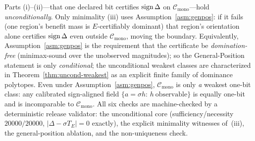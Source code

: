 \begin{remark}\label{rmk:genpos}
Parts (i)--(ii)---that one declared bit certifies $\operatorname{sign}\Delta$ on $\mathcal C_{\mathrm{mono}}$---hold
\emph{unconditionally}. Only minimality (iii) uses Assumption~\ref{asm:genpos}: if it fails (one
region's benefit mass is $E$-certifiably dominant) that region's orientation alone certifies
$\operatorname{sign}\Delta$ even outside $\mathcal C_{\mathrm{mono}}$, moving the boundary. Equivalently,
Assumption~\ref{asm:genpos} is the requirement that the certificate be \emph{domination-free}
(minimax-sound over the unobserved magnitudes); so the General-Position statement is only
\emph{conditional}; the unconditional weakest classes are characterized in
Theorem~\ref{thm:uncond-weakest} as an explicit finite family of dominance polytopes. Even under
Assumption~\ref{asm:genpos}, $\mathcal C_{\mathrm{mono}}$ is only \emph{a} weakest one-bit class:
any calibrated sign-aligned field $\{a=\sigma h:\,h\ \text{observable}\}$ is equally one-bit and
is incomparable to $\mathcal C_{\mathrm{mono}}$. All six checks are machine-checked by a
deterministic release validator: the unconditional core (sufficiency/necessity
$20000/20000$, $|\Delta-\sigma T_E|=0$ exactly), the explicit minimality witnesses of~(iii), the
general-position ablation, and the non-uniqueness check.


\end{remark}
